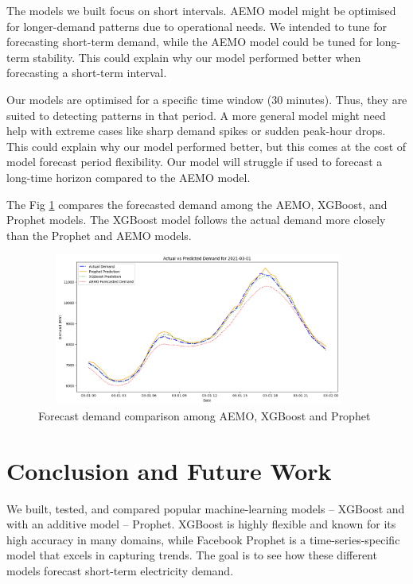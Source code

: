 \documentclass[mstat,12pt]{unswthesis}
\begin{document}
The models we built focus on short intervals. AEMO model might be
optimised for longer-demand patterns due to operational needs. We
intended to tune for forecasting short-term demand, while the AEMO model
could be tuned for long-term stability. This could explain why our model
performed better when forecasting a short-term interval.

Our models are optimised for a specific time window (30 minutes). Thus,
they are suited to detecting patterns in that period. A more general
model might need help with extreme cases like sharp demand spikes or
sudden peak-hour drops. This could explain why our model performed
better, but this comes at the cost of model forecast period flexibility.
Our model will struggle if used to forecast a long-time horizon compared
to the AEMO model.

The Fig \ref{AEMO_Prophet_XGBoost} compares the forecasted demand among
the AEMO, XGBoost, and Prophet models. The XGBoost model follows the
actual demand more closely than the Prophet and AEMO models.

\begin{figure}[H]
\centering
\includegraphics[width=0.95\textwidth, height=5cm]{AEMO_Prophet_XGBoost.png}
\caption{Forecast demand comparison among AEMO, XGBoost and Prophet}\label{AEMO_Prophet_XGBoost}
\end{figure}

\hypertarget{conclusion-and-future-work}{%
\chapter{Conclusion and Future Work}\label{conclusion-and-future-work}}

We built, tested, and compared popular machine-learning models --
XGBoost and with an additive model -- Prophet. XGBoost is highly
flexible and known for its high accuracy in many domains, while Facebook
Prophet is a time-series-specific model that excels in capturing trends.
The goal is to see how these different models forecast short-term
electricity demand.
\end{document}
